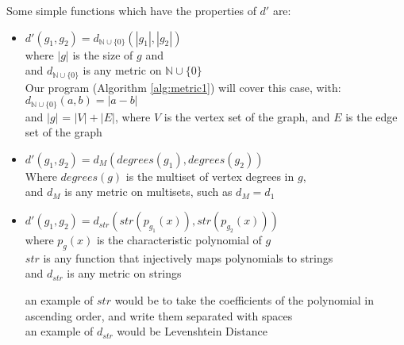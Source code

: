 	Some simple functions which have the properties of $d'$ are:
	\begin{itemize}
		\item $d'(g_1 , g_2)=d_{\mathbb{N} \cup \{0\}} (|g_1|,|g_2|)$ \\
		where $|g|$ is the size of $g$ and \\
		and $d_{\mathbb{N} \cup \{0\}}$ is any metric on $\mathbb{N} \cup \{0\}$ \\
		
		Our program (Algorithm \ref{alg:metric1}) will cover this case, with:\\
		$d_{\mathbb{N} \cup \{0\}}(a, b) = |a - b|$ \\
		and $|g|$ = $|V| + |E|$, where $V$ is the vertex set of the graph, and $E$ is the edge set of the graph
		
		\item $d'(g_1, g_2)=d_M (degrees(g_1), degrees(g_2))$ \\
		Where $degrees(g)$ is the multiset of vertex degrees in $g$, \\
		and $d_M$ is any metric on multisets, such as $d_M = d_1$
		
		\item $d'(g_1 , g_2)=d_{str} (str ( p_{g_1} (x)), str ( p_{g_2} (x)))$ \\
		where $p_g(x)$ is the characteristic polynomial of $g$ \\
		$str$ is any function that injectively maps polynomials to strings \\
		and $d_{str}$ is any metric on strings
		
		an example of $str$ would be to take the coefficients of the polynomial in ascending order, and write them separated with spaces \\
		an example of $d_{str}$ would be Levenshtein Distance
	\end{itemize}
	
\newpage
	
